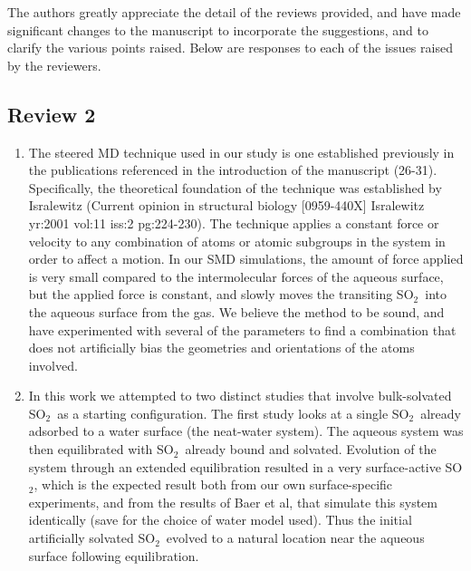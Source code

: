 \documentclass{article}
\begin{document}
\newcommand{\suldiox}{SO$_2$}
\newcommand{\ang}{\,$\textrm{\AA}$}
\newcommand{\angs}{\ang}
\newcommand{\wat}{H$_2$O}


The authors greatly appreciate the detail of the reviews provided, and have made significant changes to the manuscript to incorporate the suggestions, and to clarify the various points raised. Below are responses to each of the issues raised by the reviewers.

\subsection*{Review 2}

\begin{enumerate}

\item The steered MD technique used in our study is one established previously in the publications referenced in the introduction of the manuscript (26-31). Specifically, the theoretical foundation of the technique was established by Isralewitz (Current opinion in structural biology [0959-440X] Isralewitz yr:2001 vol:11 iss:2 pg:224-230). The technique applies a constant force or velocity to any combination of atoms or atomic subgroups in the system in order to affect a motion. In our SMD simulations, the amount of force applied is very small compared to the intermolecular forces of the aqueous surface, but the applied force is constant, and slowly moves the transiting \suldiox~into the aqueous surface from the gas. We believe the method to be sound, and have experimented with several of the parameters to find a combination that does not artificially bias the geometries and orientations of the atoms involved.

\item In this work we attempted to two distinct studies that involve bulk-solvated \suldiox~as a starting configuration. The first study looks at a single \suldiox~already adsorbed to a water surface (the neat-water system). The aqueous system was then equilibrated with \suldiox~already bound and solvated. Evolution of the system through an extended equilibration resulted in a very surface-active \suldiox, which is the expected result both from our own surface-specific experiments, and from the results of Baer et al, that simulate this system identically (save for the choice of water model used). Thus the initial artificially solvated \suldiox~evolved to a natural location near the aqueous surface following equilibration.


\end{enumerate}
\end{document}

